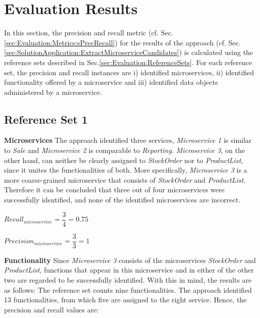 \section{Evaluation Results}
\label{sec:Evalutation:PrecisionAndRecallMeasurement}
In this section, the precision and recall metric (cf. Sec.\ref{sec:Evaluation:Metrics:sPrecRecall}) for the results of the approach (cf. Sec.\ref{sec:SolutionApplication:ExtractMicroserviceCandidates}) is calculated using the reference sets described in Sec.\ref{sec:Evaluation:ReferenceSets}. 
For each reference set, the precision and recall instances are i) identified microservices, ii) identified functionality offered by a microservice and iii) identified data objects administered by a microservice. 

\subsection{Reference Set 1}

\textbf{Microservices} The approach identified three services, \textit{Microservice 1} is similar to \textit{Sale} and \textit{Microservice 2} is comparable to \textit{Reporting}. \textit{Microservice 3}, on the other hand, can neither be clearly assigned to \textit{StockOrder} nor to \textit{ProductList}, since it unites the functionalities of both. More specifically, \textit{Microservice 3} is a more coarse-grained microservice that consists of \textit{StockOrder} and \textit{ProductList}. Therefore it can be concluded that three out of four microservices were successfully identified, and none of the identified microservices are incorrect. 

\hspace{1cm}
\noindent
\begin{minipage}{.4\linewidth}
		\vspace{0.5cm}
	\flushleft

		
	$Recall_{microservice}=\dfrac{3}{4} = 0.75  $
		\vspace{0.5cm}
	
\end{minipage}%
\begin{minipage}{.5\linewidth}
	\vspace{0.5cm}
	\flushleft

		
	$Precision_{microservice}=\dfrac{3}{3} = 1  $
		\vspace{0.5cm}
	
\end{minipage}

\noindent
\textbf{Functionality} Since \textit{Microservice 3} consists of the microservices \textit{StockOrder} and \textit{ProductList}, functions that appear in this microservice and in either of the other two are regarded to be successfully identified. With this in mind, the results are as follows: The reference set counts nine functionalities. The approach identified 13 functionalities, from which five are assigned to the right service. Hence, the precision and recall values are:

